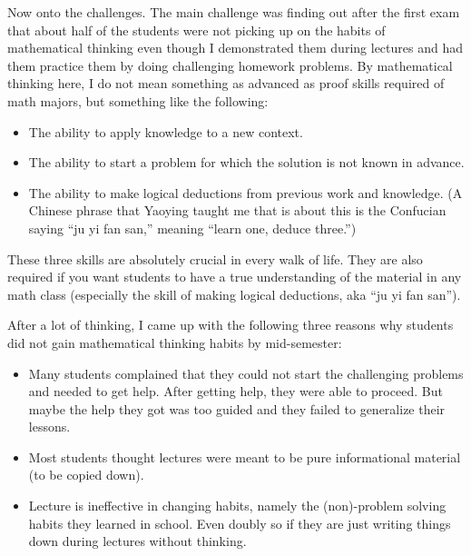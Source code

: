 \documentclass[11pt,oneside]{amsart}
\begin{document}
Now onto the challenges. The main challenge was finding out after the first exam that about half of the students were not picking up on the habits of mathematical thinking even though I demonstrated them during lectures and had them practice them by doing challenging homework problems. By mathematical thinking here, I do not mean something as advanced as proof skills required of math majors, but something like the following:
\begin{itemize}
  \item The ability to apply knowledge to a new context.
  \item The ability to start a problem for which the solution is not known in advance.
  \item The ability to make logical deductions from previous work and knowledge. (A Chinese phrase that Yaoying taught me that is about this is the Confucian saying ``ju yi fan san,'' meaning ``learn one, deduce three.'')
\end{itemize}
These three skills are absolutely crucial in every walk of life. They are also required if you want students to have a true understanding of the material in any math class (especially the skill of making logical deductions, aka ``ju yi fan san'').


After a lot of thinking, I came up with the following three reasons why students did not gain mathematical thinking habits by mid-semester:
\begin{itemize}
  \item Many students complained that they could not start the challenging problems and needed to get help. After getting help, they were able to proceed. But maybe the help they got was too guided and they failed to generalize their lessons.
  \item Most students thought lectures were meant to be pure informational material (to be copied down).
  \item Lecture is ineffective in changing habits, namely the (non)-problem solving habits they learned in school. Even doubly so if they are just writing things down during lectures without thinking.
\end{itemize}
\end{document}
